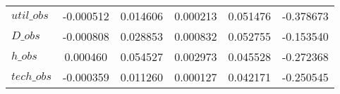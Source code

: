 \begin{center}
\begin{longtable}{lccccc}
$util\_obs      $	 & 	       -0.000512	 & 	        0.014606	 & 	        0.000213	 & 	        0.051476	 & 	       -0.378673 \\ 
$D\_obs         $	 & 	       -0.000808	 & 	        0.028853	 & 	        0.000832	 & 	        0.052755	 & 	       -0.153540 \\ 
$h\_obs         $	 & 	        0.000460	 & 	        0.054527	 & 	        0.002973	 & 	        0.045528	 & 	       -0.272368 \\ 
$tech\_obs      $	 & 	       -0.000359	 & 	        0.011260	 & 	        0.000127	 & 	        0.042171	 & 	       -0.250545 \\ 
\end{longtable}
 \end{center}
